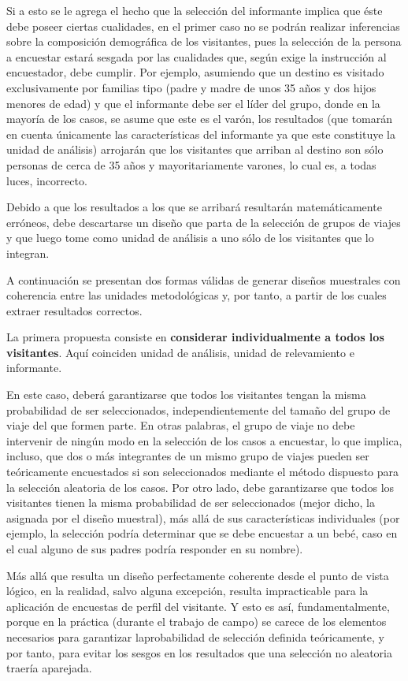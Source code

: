 \documentclass[
]{book}
\begin{document}
Si a esto se le agrega el hecho que la selección del informante implica que éste debe poseer ciertas cualidades, en el primer caso no se podrán realizar inferencias sobre la composición demográfica de los visitantes, pues la selección de la persona a encuestar estará sesgada por las cualidades que, según exige la instrucción al encuestador, debe cumplir. Por ejemplo, asumiendo que un destino es visitado exclusivamente por familias tipo (padre y madre de unos 35 años y dos hijos menores de edad) y que el informante debe ser el líder del grupo, donde en la mayoría de los casos, se asume que este es el varón, los resultados (que tomarán en cuenta únicamente las características del informante ya que este constituye la unidad de análisis) arrojarán que los visitantes que arriban al destino son sólo personas de cerca de 35 años y mayoritariamente varones, lo cual es, a todas luces, incorrecto.

Debido a que los resultados a los que se arribará resultarán matemáticamente erróneos, debe descartarse un diseño que parta de la selección de grupos de viajes y que luego tome como unidad de análisis a uno sólo de los visitantes que lo integran.

A continuación se presentan dos formas válidas de generar diseños muestrales con coherencia entre las unidades metodológicas y, por tanto, a partir de los cuales extraer resultados correctos.

La primera propuesta consiste en \textbf{considerar individualmente a todos los visitantes}. Aquí coinciden unidad de análisis, unidad de relevamiento e informante.

En este caso, deberá garantizarse que todos los visitantes tengan la misma probabilidad de ser seleccionados, independientemente del tamaño del grupo de viaje del que formen parte. En otras palabras, el grupo de viaje no debe intervenir de ningún modo en la selección de los casos a encuestar, lo que implica, incluso, que dos o más integrantes de un mismo grupo de viajes pueden ser teóricamente encuestados si son seleccionados mediante el método dispuesto para la selección aleatoria de los casos. Por otro lado, debe garantizarse que todos los visitantes tienen la misma probabilidad de ser seleccionados (mejor dicho, la asignada por el diseño muestral), más allá de sus características individuales (por ejemplo, la selección podría determinar que se debe encuestar a un bebé, caso en el cual alguno de sus padres podría responder en su nombre).

Más allá que resulta un diseño perfectamente coherente desde el punto de vista lógico, en la realidad, salvo alguna excepción, resulta impracticable para la aplicación de encuestas de perfil del visitante. Y esto es así, fundamentalmente, porque en la práctica (durante el trabajo de campo) se carece de los elementos necesarios para garantizar laprobabilidad de selección definida teóricamente, y por tanto, para evitar los sesgos en los resultados que una selección no aleatoria traería aparejada.
\end{document}
